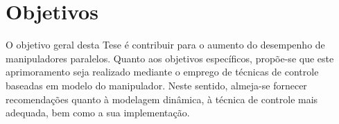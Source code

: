 \documentclass[]{politex}
\begin{document}
\section{Objetivos}\label{objetivos}

O objetivo geral desta Tese é contribuir para o aumento do desempenho de manipuladores paralelos. Quanto aos objetivos específicos, propõe-se que este aprimoramento seja realizado mediante o emprego de técnicas de controle baseadas em modelo do manipulador. Neste sentido, almeja-se fornecer recomendações quanto à modelagem dinâmica, à técnica de controle mais adequada, bem como a sua implementação.







\end{document}
